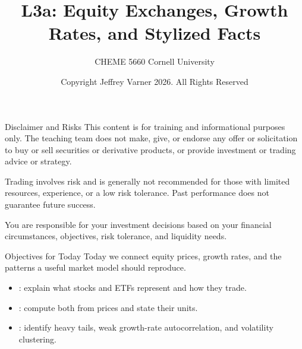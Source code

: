 \documentclass[aspectratio=169,11pt]{beamer}
\title{{\vnheavy L3a}: Equity Exchanges, Growth Rates, and Stylized Facts}
\subtitle{CHEME 5660 Cornell University}
\author{Copyright Jeffrey Varner 2026. All Rights Reserved}
\begin{document}
\vntitlepage

\begin{frame}{Disclaimer and Risks}
  \vspace{0.6em}
  \textbf{} This content is for training and informational
  purposes only. The teaching team does not make, give, or endorse any offer or
  solicitation to buy or sell securities or derivative products, or provide
  investment or trading advice or strategy.

  \vspace{1.1em}
  \textbf{} Trading involves risk and is generally not recommended for
  those with limited resources, experience, or a low risk tolerance. Past
  performance does not guarantee future success.

  \vspace{1.1em}
  \textbf{} You are responsible for your investment decisions
  based on your financial circumstances, objectives, risk tolerance, and
  liquidity needs.
\end{frame}

\begin{frame}{Objectives for Today}
  Today we connect equity prices, growth rates, and the patterns a useful
  market model should reproduce.

  \vspace{0.9em}
  {\large\textbf{}}
  \vspace{0.4em}
  \begin{itemize}\setlength{\itemsep}{0.7em}
    \item {}: explain what stocks and ETFs represent
      and how they trade.
    \item {}: compute both from prices
      and state their units.
    \item {}: identify heavy tails, weak growth-rate
      autocorrelation, and volatility clustering.
  \end{itemize}

\end{frame}
\end{document}
